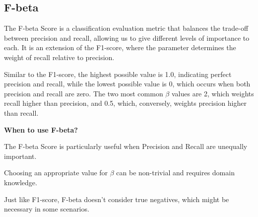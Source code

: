 \subsection{F-beta}

The F-beta Score is a classification evaluation metric that balances the trade-off between precision and recall, allowing us to give different levels of importance to each.
It is an extension of the F1-score, where the parameter  determines the weight of recall relative to precision.

\begin{center}
\end{center}

Similar to the F1-score, the highest possible value is 1.0, indicating perfect precision and recall, while the lowest possible value is 0, which occurs when both precision and recall are zero.
The two most common $\beta$ values are 2, which weights recall higher than precision, and 0.5, which, conversely, weights precision higher than recall.

\textbf{When to use F-beta?}

The F-beta Score is particularly useful when Precision and Recall are unequally important.

{
\item Choosing an appropriate value for $\beta$ can be non-trivial and requires domain knowledge.
\item Just like F1-score, F-beta doesn't consider true negatives, which might be necessary in some scenarios.
}

